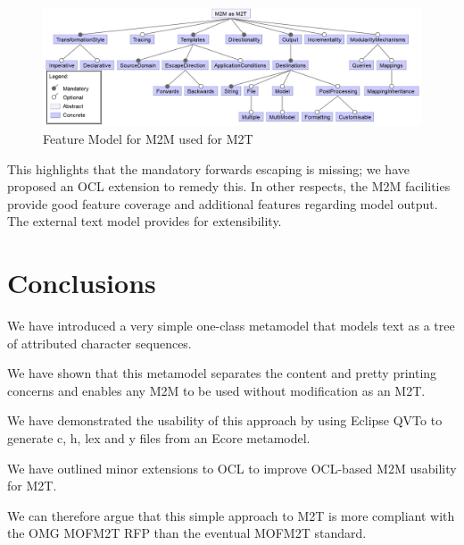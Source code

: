 \documentclass{llncs}
\begin{document}
\begin{figure}
	\begin{center}
		\includegraphics[width=4.9in]{M2MM2TFeatureModel.png}
	\end{center}
	\caption{Feature Model for M2M used for M2T}
	\label{fig:M2MM2TFeatureModel}
\end{figure}

This highlights that the mandatory forwards escaping is missing; we have proposed an OCL extension to remedy this. In other respects, the M2M facilities provide good feature coverage and additional features regarding model output. The external text model provides for extensibility.

\section{Conclusions}\label{Conclusions}

We have introduced a very simple one-class metamodel that models text as a tree of attributed character sequences.

We have shown that this metamodel separates the content and pretty printing concerns and enables any M2M to be used without modification as an M2T.

We have demonstrated the usability of this approach by using Eclipse QVTo to generate c, h, lex and y files from an Ecore metamodel.

We have outlined minor extensions to OCL to improve OCL-based M2M usability for M2T.

We can therefore argue that this simple approach to M2T is more compliant with the OMG MOFM2T RFP than the eventual MOFM2T standard.
\end{document}
